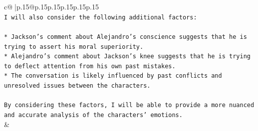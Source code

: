 \documentclass{article}
\begin{document}
{\begin{supertabular}{c@{$\;$}|p{.15\linewidth}@{}p{.15\linewidth}p{.15\linewidth}p{.15\linewidth}p{.15\linewidth}p{.15\linewidth}}
{{{\\ 
\texttt{I will also consider the following additional factors:} \\
\\ 
\texttt{* Jackson's comment about Alejandro's conscience suggests that he is trying to assert his moral superiority.} \\
\texttt{* Alejandro's comment about Jackson's knee suggests that he is trying to deflect attention from his own past mistakes.} \\
\texttt{* The conversation is likely influenced by past conflicts and unresolved issues between the characters.} \\
\\ 
\texttt{By considering these factors, I will be able to provide a more nuanced and accurate analysis of the characters' emotions.} \\
            }
        }
    }
    & \\ \\

\end{supertabular}
}
\end{document}
